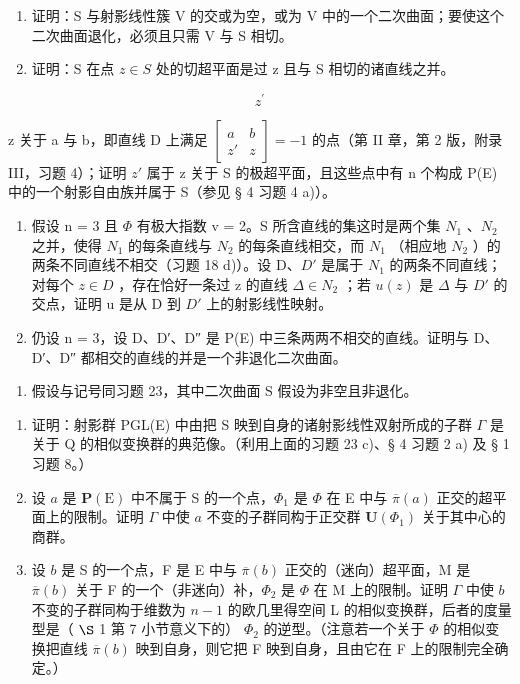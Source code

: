 \begin{enumerate}
\def\labelenumi{\alph{enumi})}
\item
  证明：S 与射影线性簇 V 的交或为空，或为 V 中的一个二次曲面；要使这个二次曲面退化，必须且只需 V 与 S 相切。
\item
  证明：S 在点 \(z \in S\) 处的切超平面是过 z 且与 S 相切的诸直线之并。
\end{enumerate}

\[
z ^ {\prime}
\]

z 关于 a 与 b，即直线 D 上满足 \(\begin{bmatrix} a & b \\ z' & z \end{bmatrix} = -1\) 的点（第 II 章，第 2 版，附录 III，习题 4）；证明 \(z'\) 属于 z 关于 S 的极超平面，且这些点中有 n 个构成 P(E) 中的一个射影自由族并属于 S（参见 § 4 习题 4 a)）。

\begin{enumerate}
\def\labelenumi{\alph{enumi})}
\setcounter{enumi}{3}
\item
  假设 n = 3 且 \(\Phi\) 有极大指数 v = 2。S 所含直线的集这时是两个集 \(N_{1}\) 、\(N_{2}\) 之并，使得 \(N_{1}\) 的每条直线与 \(N_{2}\) 的每条直线相交，而 \(N_{1}\) （相应地 \(N_{2}\) ）的两条不同直线不相交（习题 18 d)）。设 D、\(D'\) 是属于 \(N_{1}\) 的两条不同直线；对每个 \(z \in D\) ，存在恰好一条过 z 的直线 \(\Delta \in N_{2}\) ；若 \(u(z)\) 是 \(\Delta\) 与 \(D'\) 的交点，证明 u 是从 D 到 \(D'\) 上的射影线性映射。
\item
  仍设 n = 3，设 D、D′、D″ 是 P(E) 中三条两两不相交的直线。证明与 D、D′、D″ 都相交的直线的并是一个非退化二次曲面。
\end{enumerate}

\begin{enumerate}
\def\labelenumi{\arabic{enumi})}
\setcounter{enumi}{23}
\tightlist
\item
  假设与记号同习题 23，其中二次曲面 S 假设为非空且非退化。
\end{enumerate}

\begin{enumerate}
\def\labelenumi{\alph{enumi})}
\item
  证明：射影群 PGL(E) 中由把 S 映到自身的诸射影线性双射所成的子群 \(\Gamma\) 是关于 Q 的相似变换群的典范像。（利用上面的习题 23 c)、§ 4 习题 2 a) 及 § 1 习题 8。）
\item
  设 \(a\) 是 \(\mathbf{P}(\mathrm{E})\) 中不属于 S 的一个点，\(\Phi_{1}\) 是 \(\Phi\) 在 E 中与 \(\overline{\pi}(a)\) 正交的超平面上的限制。证明 \(\Gamma\) 中使 \(a\) 不变的子群同构于正交群 \(\mathbf{U}(\Phi_1)\) 关于其中心的商群。
\item
  设 \(b\) 是 S 的一个点，F 是 E 中与 \(\overline{\pi}(b)\) 正交的（迷向）超平面，M 是 \(\overline{\pi}(b)\) 关于 F 的一个（非迷向）补，\(\Phi_{2}\) 是 \(\Phi\) 在 M 上的限制。证明 \(\Gamma\) 中使 \(b\) 不变的子群同构于维数为 \(n-1\) 的欧几里得空间 L 的相似变换群，后者的度量型是（ \(\S\) 1 第 7 小节意义下的） \(\Phi_{2}\) 的逆型。（注意若一个关于 \(\Phi\) 的相似变换把直线 \(\overline{\pi}(b)\) 映到自身，则它把 F 映到自身，且由它在 F 上的限制完全确定。）
\end{enumerate}

